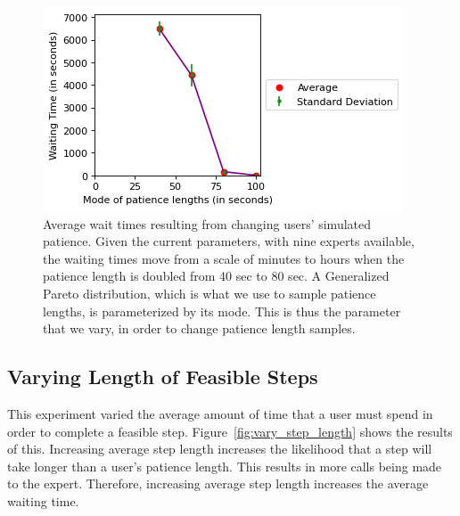 \begin{figure}[h]
  \includegraphics{figures/montecarlo/vary_patience.png}
  \caption[
  Average wait times resulting from changing users' simulated patience
  ]{
    Average wait times resulting from changing users' simulated patience.
    Given the current parameters, with nine experts available, the waiting times
    move from a scale of minutes to hours when the patience length is doubled
    from 40 sec to 80 sec.
    A Generalized Pareto distribution, which is what we use to sample patience
    lengths, is parameterized by its mode.
    This is thus the parameter that we vary, in order to change patience length
    samples.
  }\label{fig:vary_patience}
\end{figure}

\subsection{Varying Length of Feasible Steps}

This experiment varied the average amount of time that a user must spend in
order to complete a feasible step.
Figure~\ref{fig:vary_step_length} shows the results of this.
Increasing average step length increases the likelihood that a step will take
longer than a user's patience length.
This results in more calls being made to the expert.
Therefore, increasing average step length increases the average waiting time.

